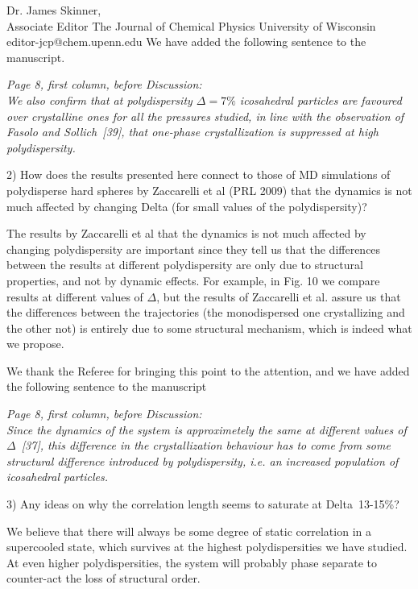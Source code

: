 \documentclass[a4paper, rebuttal, parskip=true, firsthead=false, fromemail=false, foldmarks=false]{scrlttr2}
\begin{document}
\begin{letter}{Dr. James Skinner,\\Associate Editor
The Journal of Chemical Physics
University of Wisconsin\\
editor-jcp@chem.upenn.edu }
We have added the following sentence to the manuscript.

{\it Page 8, first column, before Discussion:\\
We also confirm that at polydispersity $\Delta=7\%$ icosahedral particles are favoured over crystalline ones for
all the pressures studied, in line with the observation of Fasolo and Sollich~[39], that
one-phase crystallization is suppressed at high polydispersity.
}



\begin{quotationi}
2) How does the results presented here connect to those of MD simulations of polydisperse hard spheres by Zaccarelli et al (PRL 2009) that the dynamics is not much affected by changing Delta (for small values of the polydispersity)?
\end{quotationi}

The results by Zaccarelli et al that the dynamics is not much affected by changing polydispersity are important since they tell
us that the differences between the results at different polydispersity are only due to structural properties, and not by
dynamic effects. For example, in Fig. 10 we compare results at different values of $\Delta$, but the results of Zaccarelli et al.
assure us that the differences between the trajectories (the monodispersed one crystallizing and the other not) is entirely due
to some structural mechanism, which is indeed what we propose.

We thank the Referee for bringing this point to the attention, and we have added the following sentence to the manuscript

{\it Page 8, first column, before Discussion:\\
Since the dynamics of the
system is approximetely the same at different values of $\Delta$~[37], this difference in the crystallization behaviour has to come from
some structural difference introduced by polydispersity, i.e. an increased population of icosahedral particles.}


\begin{quotationi}
3) Any ideas on why the correlation length seems to saturate at Delta~13-15\%?
\end{quotationi}

We believe that there will always be some degree of static correlation in a supercooled state, which
survives at the highest polydispersities we have studied. At even higher polydispersities, the system
will probably phase separate to counter-act the loss of structural order.



\end{letter}
\end{document}
